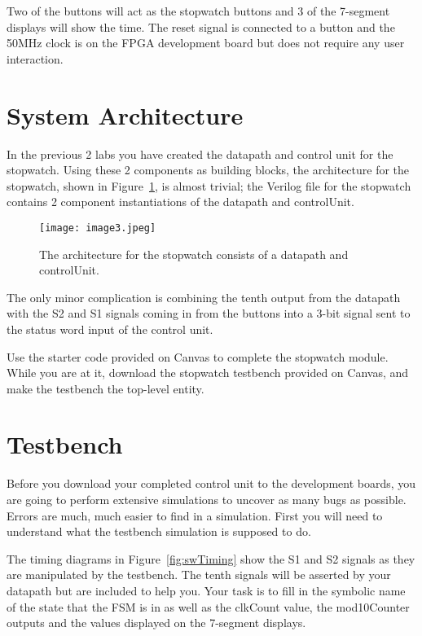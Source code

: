 Two of the buttons will act as the stopwatch buttons
and 3 of the 7-segment displays will show the time. The reset signal is
connected to a button and the 50MHz clock is on the FPGA
development board but does not require any user
interaction.

\section{System Architecture}

In the previous 2 labs you have created the datapath and control unit
for the stopwatch. Using these 2 components as building blocks, the
architecture for the stopwatch, shown in Figure~\ref{fig:swArch}, is almost trivial;
the Verilog file for the stopwatch contains 2 component instantiations
of the datapath and controlUnit.

\begin{figure}
    \texttt{[image: image3.jpeg]}
    \caption{The architecture for the stopwatch consists of a datapath and
    controlUnit.}
    \label{fig:swArch}
\end{figure}

The only minor complication is combining the tenth output from the
datapath with the S2 and S1 signals coming in from the
buttons into a 3-bit signal sent to the status word input of the control
unit.

Use the starter code provided on Canvas to complete the stopwatch
module. While you are at it, download the stopwatch testbench provided
on Canvas, and make the testbench the top-level entity.

\section{Testbench}

Before you download your completed control unit to the development boards,
you are going to perform extensive simulations to uncover as many bugs
as possible. Errors are much, much easier to find in a simulation. First
you will need to understand what the testbench simulation is supposed to
do.

The timing diagrams in Figure~\ref{fig:swTiming} show the S1 and S2 signals
as they are manipulated by the testbench. The tenth signals will be
asserted by your datapath but are included to help you. Your task is to
fill in the symbolic name of the state that the FSM is in as well as the
clkCount value, the mod10Counter outputs and the values displayed on the
7-segment displays.

